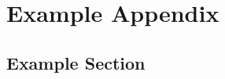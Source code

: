\cleardoublepageforprint	%

\chapter{Example Appendix}
\label{app:example}

\section{Example Section}
\label{sec:app.example.examplesec}

\lipsum[5-6]
